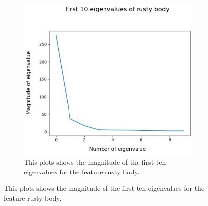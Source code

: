
\begin{figure}[H]
	\centering
	\begin{subfigure}{0.7\textwidth}
		\includegraphics[width=0.9\linewidth]{Figures/chapter04/pca_rustybody_graph.png} 
		\caption{This plots shows the magnitude of the first ten eigenvalues for the feature rusty body.}
	\end{subfigure}
	\vspace{20pt}
	

\end{figure}
